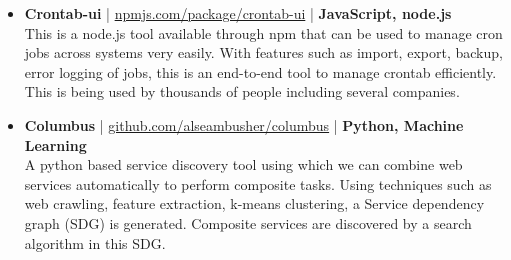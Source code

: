 \begin{itemize}
 \item \textbf{Crontab-ui} | \href{http://npmjs.com/package/crontab-ui}{npmjs.com/package/crontab-ui} | \textbf{JavaScript, node.js}\\
 This is a node.js tool available through npm that can be used to manage cron jobs across systems very easily. With features such as import, export, backup, error logging of jobs, this is an end-to-end tool to manage crontab efficiently. This is being used by thousands of people including several companies.

 \item \textbf{Columbus} | \href{http://github.com/alseambusher/columbus}{github.com/alseambusher/columbus} | \textbf{Python, Machine Learning}\\
 A python based service discovery tool using which we can combine web services automatically to perform composite tasks. Using techniques such as web crawling, feature extraction, k-means clustering, a Service dependency graph (SDG) is generated. Composite services are discovered by a search algorithm in this SDG.


\end{itemize}
\vspace{5pt}
